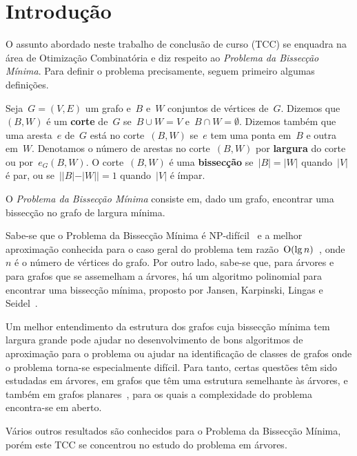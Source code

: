 \section{Introdução}

O assunto abordado neste trabalho de conclusão de curso (TCC) se
enquadra na área de Otimização Combinatória e diz respeito ao 
\emph{Problema da Bissecção Mínima}. Para definir o problema 
precisamente, seguem primeiro algumas definições. 

Seja~${G=(V,E)}$ um grafo e~$B$ e~$W$ conjuntos de vértices de~$G$.
Dizemos que~$(B,W)$ é um \textbf{corte}
de~$G$ se~${B \cup W =V}$ e~${B\cap W =\emptyset}$.
Dizemos também que uma aresta~$e$ de~$G$ está no corte~$(B,W)$
se~$e$ tem uma ponta em~$B$ e outra em~$W$. 
Denotamos o número de arestas no corte~$(B,W)$ por \textbf{largura}
do corte ou por~$e_G(B,W)$.
O corte~$(B,W)$ é uma \textbf{bissecção} se~${|B| =|W|}$
quando~$|V|$ é par, ou se~${||B|-|W|| =1}$ quando~$|V|$ é ímpar.

O \emph{Problema da Bissecção Mínima} consiste em, dado um grafo, 
encontrar uma bissecção no grafo de largura mínima.

Sabe-se que o Problema da Bissecção Mínima é NP-difícil~\cite{GareyJS76} 
e a melhor aproximação conhecida para o caso geral do problema tem 
razão~$\mathrm{O}(\lg n)$~\cite{Racke08}, onde~$n$ é o número de vértices 
do grafo. 
Por outro lado, sabe-se que, para árvores e para grafos que  
se assemelham a árvores, há um algoritmo polinomial 
para encontrar uma bissecção mínima, 
proposto por Jansen, Karpinski, Lingas e 
Seidel~\cite{JansenKLS01}. 

Um melhor entendimento da estrutura 
dos grafos cuja bissecção mínima tem largura grande
pode ajudar no 
desenvolvimento de bons algoritmos de aproximação para
o problema ou ajudar na 
identificação de classes de grafos onde o problema torna-se 
especialmente difícil. 
Para tanto, certas questões têm sido estudadas em árvores, 
em grafos que têm uma estrutura semelhante às árvores, e também em 
grafos planares~\cite{FernandesST13,FernandesST15}, para os quais 
a complexidade do problema encontra-se em aberto. 

Vários outros resultados são conhecidos para o Problema da 
Bissecção Mínima, porém este TCC se 
concentrou no estudo do problema em árvores.



